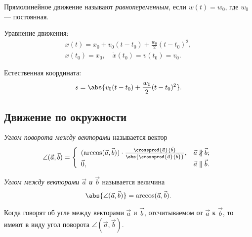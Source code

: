 \begin{definition}
  Прямолинейное движение называют \textit{равнопеременным}, если $w(t) = w_0$,
  где $w_0$ --- постоянная.

  Уравнение движения:
  \begin{equation*}
    \begin{gathered}
      x(t) = x_0 + v_0 (t - t_0) + \frac{w_0}{2} (t - t_0)^2, \\
      x(t_0) = x_0, \quad \dot{x}(t_0) = v(t_0) = v_0.
    \end{gathered}
  \end{equation*}

  Естественная координата:
  \begin{equation*}
    s = \abs{v_0 (t - t_0) + \frac{w_0}{2} (t - t_0)^2}.
  \end{equation*}
\end{definition}

\subsection{Движение по окружности}

\begin{definition}
  \textit{Углом поворота между векторами} называется вектор
  \begin{equation*}
    \angle (\vec{a}, \vec{b}) = \left\{
      \begin{array}{l l}
        (\arccos(\vec{a}, \vec{b})) \cdot
        \frac{\crossprod{\vec{a}}{\vec{b}}}
        {\abs{\crossprod{\vec{a}}{\vec{b}}}}, &
        \vec{a} \nparallel \vec{b}; \\

        \vec{0}, & \vec{a} \parallel \vec{b}.
      \end{array}
      \right.
  \end{equation*}
\end{definition}

\begin{definition}
  \textit{Углом между векторами $\vec{a}$ и $\vec{b}$} называется величина
  \begin{equation*}
    \abs{\angle (\vec{a}, \vec{b})} = \arccos(\vec{a}, \vec{b}).
  \end{equation*}
\end{definition}

Когда говорят об угле между векторами $\vec{a}$ и $\vec{b}$, отсчитываемом от
$\vec{a}$ к $\vec{b}$, то имеют в виду угол поворота $\angle(\vec{a}, \vec{b})$.

